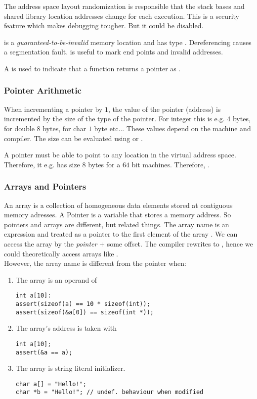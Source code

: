 The address space layout randomization is responsible that the stack bases and shared library location addresses change for each execution. This is a security feature which makes debugging tougher. But it could be disabled.

 is a \textit{guaranteed-to-be-invalid} memory location and has type . Dereferencing  causes a segmentation fault.  is useful to mark end points and invalid addresses.

A \code{*} is used to indicate that a function returns a pointer as .

\subsubsection{Pointer Arithmetic}
When incrementing a pointer by $1$, the value of the pointer (address) is incremented by the size of the type of the pointer. For integer this is e.g. $4$ bytes, for double $8$ bytes, for char $1$ byte etc... These values depend on the machine and compiler. The size can be evaluated using  or .

A pointer must be able to point to any location in the virtual address space. Therefore, it e.g. has size $8$ bytes for a  $64$ bit machines. Therefore, .

\subsubsection{Arrays and Pointers}
An array is a collection of homogeneous data elements stored at contiguous memory adresses. A Pointer is a variable that stores a memory address. So pointers and arrays are different, but related things. The array name is an expression and treated as a pointer to the first element of the array . We can access the array by the \textit{pointer} $+$ some offset. The compiler rewrites  to , hence we could theoretically access arrays like .\\
However, the array name is different from the pointer when:
\begin{enumerate}
    \item The array is an operand of 
\begin{lstlisting}
int a[10]:
assert(sizeof(a) == 10 * sizeof(int));
assert(sizeof(&a[0]) == sizeof(int *));
\end{lstlisting}
    \item The array's address is taken with \code{\&}
\begin{lstlisting}
int a[10];
assert(&a == a);
\end{lstlisting}
    \item The array is string literal initializer. 
\begin{lstlisting}
char a[] = "Hello!";
char *b = "Hello!"; // undef. behaviour when modified
\end{lstlisting}
\end{enumerate}

